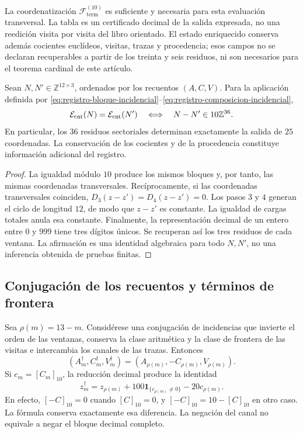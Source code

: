 La coordenatización \(\mathscr F_{\mathrm{term}}^{(10)}\) es suficiente y necesaria
para esta evaluación transversal. La tabla es un certificado decimal de la
salida expresada, no una reedición visita por visita del libro orientado. El
estado enriquecido conserva además cocientes euclídeos, visitas, trazas y
procedencia; esos campos no se declaran recuperables a partir de los treinta y
seis residuos, ni son necesarios para el teorema cardinal de este artículo.

\begin{proposition}
\label{prop:registro-36-residuos}
Sean \(N,N'\in\mathbb Z^{12\times3}\), ordenados por los recuentos
\((A,C,V)\). Para la aplicación definida por
\eqref{eq:registro-bloque-incidencial}--\eqref{eq:registro-composicion-incidencial},
\[
 \mathcal E_{\rm cnt}(N)=\mathcal E_{\rm cnt}(N')
 \quad\Longleftrightarrow\quad
 N-N'\in10\mathbb Z^{36}.
\]
En particular, los \(36\) residuos sectoriales determinan exactamente
la salida de \(25\) coordenadas. La conservación de los cocientes y
de la procedencia constituye información adicional del registro.
\end{proposition}

\begin{proof}
La igualdad módulo \(10\) produce los mismos bloques y, por tanto,
las mismas coordenadas transversales. Recíprocamente, si las coordenadas
transversales coinciden, \(D_3(z-z')=D_4(z-z')=0\). Los pasos
\(3\) y \(4\) generan el ciclo de longitud \(12\), de modo que
\(z-z'\) es constante. La igualdad de cargas totales anula esa
constante. Finalmente, la representación decimal de un entero entre
\(0\) y \(999\) tiene tres dígitos únicos. Se recuperan así los
tres residuos de cada ventana. La afirmación es una identidad algebraica
para todo \(N,N'\), no una inferencia obtenida de pruebas finitas.
\end{proof}

\subsection{Conjugación de los recuentos y términos de frontera}
\label{subsec:registro-conjugacion-incidencial}

Sea \(\rho(m)=13-m\). Considérese una conjugación de incidencias
que invierte el orden de las ventanas, conserva la clase aritmética y la
clase de frontera de las visitas e intercambia los canales de las trazas.
Entonces
\[
 (A_m^\dagger,C_m^\dagger,V_m^\dagger)
 =(A_{\rho(m)},-C_{\rho(m)},V_{\rho(m)}).
\]
Si \(c_m=[C_m]_{10}\), la reducción decimal produce la identidad
\begin{equation}
 z_m^\dagger=z_{\rho(m)}
       +100\mathbf1_{\{c_{\rho(m)}\ne0\}}-20c_{\rho(m)}.
 \label{eq:registro-conjugacion-decimal}
\end{equation}
En efecto, \([-C]_{10}=0\) cuando \([C]_{10}=0\), y
\([-C]_{10}=10-[C]_{10}\) en otro caso. La fórmula conserva
exactamente esa diferencia. La negación del canal no equivale a negar
el bloque decimal completo.


